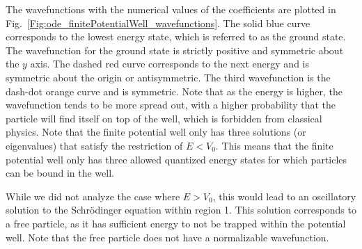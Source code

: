 The wavefunctions with the numerical values of the coefficients are plotted in Fig.~\ref{Fig:ode_finitePotentialWell_wavefunctions}. The solid blue curve corresponds to the lowest energy state, which is referred to as the ground state. The wavefunction for the ground state is strictly positive and symmetric about the $y$ axis. The dashed red curve corresponds to the next energy and is symmetric about the origin or antisymmetric. The third wavefunction is the dash-dot orange curve and is symmetric. Note that as the energy is higher, the wavefunction tends to be more spread out, with a higher probability that the particle will find itself on top of the well, which is forbidden from classical physics. Note that the finite potential well only has three solutions (or eigenvalues) that satisfy the restriction of $E < V_0$. This means that the finite potential well only has three allowed quantized energy states for which particles can be bound in the well.

While we did not analyze the case where $E > V_0$, this would lead to an oscillatory solution to the Schr{\"o}dinger equation within region 1. This solution corresponds to a free particle, as it has sufficient energy to not be trapped within the potential well. Note that the free particle does not have a normalizable wavefunction.

